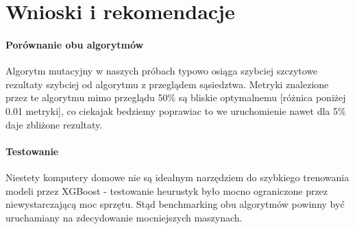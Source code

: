 \documentclass[11pt]{article}
\begin{document}
\section{Wnioski i rekomendacje}
\paragraph{Porównanie obu algorytmów}
Algorytm mutacyjny w naszych próbach typowo osiąga szybciej szczytowe rezultaty szybciej od algorytmu z przeglądem sąsiedztwa. Metryki znalezione przez te algorytmu mimo przeglądu 50\% są bliskie optymalnemu [różnica poniżej 0.01 metryki], co ciekajak bedziemy poprawiac to we uruchomienie nawet dla 5\% daje zbliżone rezultaty.
\paragraph{Testowanie}
Niestety komputery domowe nie są idealnym narzędziem do szybkiego trenowania modeli przez XGBoost - testowanie heurustyk było mocno ograniczone przez niewystarczającą moc sprzętu. Stąd benchmarking obu algorytmów powinny być uruchamiany na zdecydowanie mocniejszych maszynach.
\end{document}
